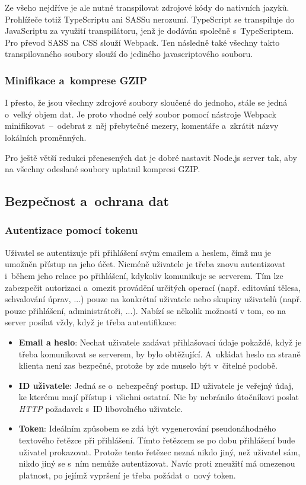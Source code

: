 \documentclass[a4paper,12pt]{article}
\begin{document}
Ze všeho nejdříve je ale nutné transpilovat zdrojové kódy do nativních jazyků. Prohlížeče totiž TypeScriptu ani SASSu nerozumí. TypeScript se transpiluje do JavaScriptu za využití transpilátoru, jenž je dodáván společně s~TypeScriptem. Pro převod SASS na CSS slouží Webpack. Ten následně také všechny takto transpilovaného soubory slouží do jediného javascriptového souboru.

\subsubsection{Minifikace a~komprese GZIP}

I přesto, že jsou všechny zdrojové soubory sloučené do jednoho, stále se jedná o~velký objem dat. Je proto vhodné celý soubor pomocí nástroje Webpack minifikovat~–~odebrat z~něj přebytečné mezery, komentáře a~zkrátit názvy lokálních proměnných.

Pro ještě větší redukci přenesených dat je dobré nastavit Node.js server tak, aby na všechny odeslané soubory uplatnil kompresi GZIP.

\subsection{Bezpečnost a~ochrana dat}

\subsubsection{Autentizace pomocí tokenu}

Uživatel se autentizuje při přihlášení svým emailem a heslem, čímž mu je umožněn přístup na jeho účet. Nicméně uživatele je třeba znovu autentizovat i~během jeho relace po přihlášení, kdykoliv komunikuje se serverem. Tím lze zabezpečit autorizaci a~omezit provádění určitých operací (např. editování tělesa, schvalování úprav, ...) pouze na konkrétní uživatele nebo skupiny uživatelů (např. pouze přihlášení, administrátoři, ...). Nabízí se několik možností v tom, co na server posílat vždy, když je třeba autentifikace:

\begin{itemize}
\item \textbf{Email a heslo}: Nechat uživatele zadávat přihlašovací údaje pokaždé, když je třeba komunikovat se serverem, by bylo obtěžující. A~ukládat heslo na straně klienta není zas bezpečné, protože by zde muselo být v~čitelné podobě.

\item \textbf{ID uživatele}: Jedná se o~nebezpečný postup. ID uživatele je veřejný údaj, ke kterému mají přístup i~všichni ostatní. Nic by nebránilo útočníkovi poslat \textit{HTTP} požadavek s~ID libovolného uživatele.

\item \textbf{Token}: Ideálním způsobem se zdá být vygenerování pseudonáhodného textového řetězce při přihlášení. Tímto řetězcem se po dobu přihlášení bude uživatel prokazovat. Protože tento řetězec nezná nikdo jiný, než uživatel sám, nikdo jiný se s~ním nemůže autentizovat. Navíc proti zneužití má omezenou platnost, po jejímž vypršení je třeba požádat o~nový token.
\end{itemize}
\end{document}
